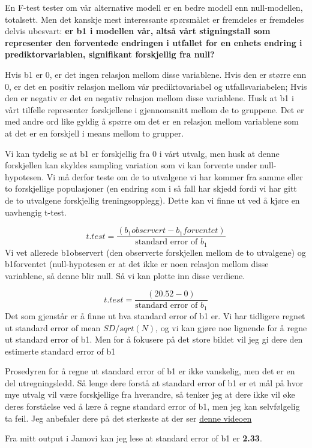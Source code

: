 \documentclass[
]{book}
\begin{document}
En F-test tester om vår alternative modell er en bedre modell enn null-modellen, totalsett. Men det kanskje mest interessante spørsmålet er fremdeles er fremdeles delvis ubesvart: \textbf{er b1 i modellen vår, altså vårt stigningstall som representer den forventede endringen i utfallet for en enhets endring i prediktorvariablen, signifikant forskjellig fra null?}

Hvis b1 er 0, er det ingen relasjon mellom disse variablene. Hvis den er større enn 0, er det en positiv relasjon mellom vår prediktovariabel og utfallsvariabelen; Hvis den er negativ er det en negativ relasjon mellom disse variablene. Husk at b1 i vårt tilfelle representer forskjellene i gjennomsnitt mellom de to gruppene. Det er med andre ord like gyldig å spørre om det er en relasjon mellom variablene som at det er en forskjell i means mellom to grupper.

Vi kan tydelig se at b1 er forskjellig fra 0 i vårt utvalg, men husk at denne forskjellen kan skyldes sampling variation som vi kan forvente under null-hypotesen. Vi må derfor teste om de to utvalgene vi har kommer fra samme eller to forskjellige populasjoner (en endring som i så fall har skjedd fordi vi har gitt de to utvalgene forskjellig treningsopplegg). Dette kan vi finne ut ved å kjøre en uavhengig t-test.

\[
t.test = \frac{(b_1observert - b_1forventet)}{\text{standard error of } b_1}
\]
Vi vet allerede b1observert (den observerte forskjellen mellom de to utvalgene) og b1forventet (null-hypotesen er at det ikke er noen relasjon mellom disse variablene, så denne blir null. Så vi kan plotte inn disse verdiene.

\[
t.test = \frac{(20.52 - 0)}{\text{standard error of } b_1}
\]
Det som gjenstår er å finne ut hva standard error of b1 er. Vi har tidligere regnet ut standard error of mean \(SD/sqrt(N)\), og vi kan gjøre noe lignende for å regne ut standard error of b1. Men for å fokusere på det store bildet vil jeg gi dere den estimerte standard error of b1

Prosedyren for å regne ut standard error of b1 er ikke vanskelig, men det er en del utregningsledd. Så lenge dere forstå at standard error of b1 er et mål på hvor mye utvalg vil være forskjellige fra hverandre, så tenker jeg at dere ikke vil øke deres forståelse ved å lære å regne standard error of b1, men jeg kan selvfølgelig ta feil. Jeg anbefaler dere på det sterkeste at der ser \href{https://www.youtube.com/watch?v=3L9ZMdzJyyI}{denne videoen}

Fra mitt output i Jamovi kan jeg lese at standard error of b1 er \textbf{2.33}.
\end{document}
